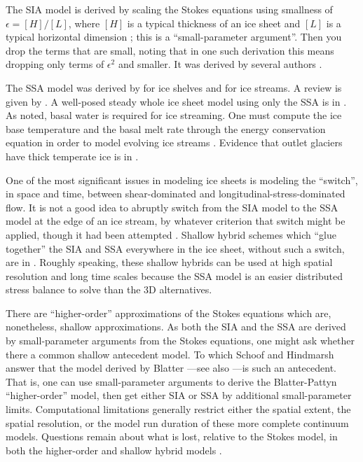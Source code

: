 \documentclass[titlepage,letterpaper,final,12pt]{scrartcl}
\newcommand{\eps}{\epsilon}
\begin{document}
The SIA model is derived by scaling the Stokes equations using smallness of $\eps = [H]/[L]$, where $[H]$ is a typical thickness of an ice sheet and $[L]$ is a typical horizontal dimension \cite{Fowler}; this is a ``small-parameter argument''.  Then you drop the terms that are small, noting that in one such derivation this means dropping only terms of $\eps^2$ and smaller.  It was derived by several authors \cite{FowlerLarson1978,MorlandJohnson,Hutter}.  

The SSA model was derived by \cite{Morland} for ice shelves and \cite{MacAyeal} for ice streams.  A review is given by \cite{WeisGreveHutter}.  A well-posed steady whole ice sheet model using only the SSA is in \cite{SchoofStream}.  As noted, basal water is required for ice streaming.  One must compute the ice base temperature and the basal melt rate through the energy conservation equation in order to model evolving ice streams \cite{Clarke05,Raymondenergy}.  Evidence that outlet glaciers have thick temperate ice is in \cite{Luethietal2009}.

One of the most significant issues in modeling ice sheets is modeling the ``switch'', in space and time, between shear-dominated and longitudinal-stress-dominated flow.  It is not a good idea to abruptly switch from the SIA model to the SSA model at the edge of an ice stream, by whatever criterion that switch might be applied, though it had been attempted \cite{HulbeMacAyeal,Ritzetal2001}.  Shallow hybrid schemes which ``glue together'' the SIA and SSA everywhere in the ice sheet, without such a switch, are in \cite{PollardDeConto,BBssasliding,Goldberg2011}.  Roughly speaking, these shallow hybrids can be used at high spatial resolution and long time scales because the SSA model is an easier distributed stress balance to solve than the 3D alternatives.

There are ``higher-order'' approximations of the Stokes equations which are, nonetheless, shallow approximations.  As both the SIA and the SSA are derived by small-parameter arguments from the Stokes equations, one might ask whether there a common shallow antecedent model.  To which Schoof and Hindmarsh \cite{SchoofHindmarsh} answer that the model derived by Blatter \cite{Blatter}---see also \cite{Pattyn03}---is such an antecedent.  That is, one can use small-parameter arguments to derive the Blatter-Pattyn ``higher-order'' model, then get either SIA or SSA by additional small-parameter limits.  Computational limitations generally restrict either the spatial extent, the spatial resolution, or the model run duration of these more complete continuum models.  Questions remain about what is lost, relative to the Stokes model, in both the higher-order and shallow hybrid models \cite[for example]{ISMIPHOM}.
\end{document}
